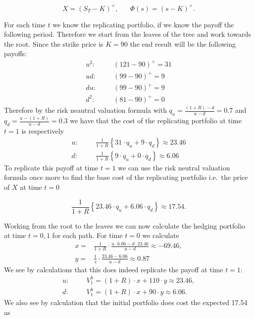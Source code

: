 \documentclass[
]{book}
\begin{document}
\[
X=(S_T-K)^+,\hspace{20pt}\Phi(s)=(s-K)^+.
\]

For each time \(t\) we know the replicating portfolio, if we know the payoff the following period. Therefore we start from the leaves of the tree and work towards the root. Since the strike price is \(K=90\) the end result will be the following payoffs:
\begin{align*}
u^2:\hspace{20pt}&(121-90)^+=31\\
ud:\hspace{20pt}&(99-90)^+=9\\
du:\hspace{20pt}&(99-90)^+=9\\
d^2:\hspace{20pt}&(81-90)^+=0
\end{align*}
Therefore by the risk neautral valuation formula with \(q_u=\frac{(1+R)-d}{u-d}=0.7\) and \(q_d=\frac{u-(1+R)}{u-d}=0.3\) we have that the cost of the replicating portfolio at time \(t=1\) is respectively
\begin{align*}
u:\hspace{20pt}&\frac{1}{1+R}\left\{31\cdot q_u + 9 \cdot q_d\right\}\approx 23.46\\
d:\hspace{20pt}&\frac{1}{1+R}\left\{9\cdot q_u + 0 \cdot q_d\right\}\approx 6.06
\end{align*}
To replicate this payoff at time \(t=1\) we can use the risk neutral valuation formula once more to find the base cost of the replicating portfolio i.e.~the price of \(X\) at time \(t=0\)

\[
\frac{1}{1+R}\left\{23.46\cdot q_u + 6.06 \cdot q_d\right\}\approx 17.54.
\]

Working from the root to the leaves we can now calculate the hedging portfolio at time \(t=0,1\) for each path. For time \(t=0\) we calculate
\begin{align*}
x=&\frac{1}{1+R}\cdot \frac{u\cdot 6.06-d\cdot 23.46}{u-d}\approx -69.46,\\
y=&\frac{1}{s}\cdot\frac{23.46-6.06}{u-d}\approx0.87
\end{align*}
We see by calculations that this does indeed replicate the payoff at time \(t=1\):
\begin{align*}
u:\hspace{20pt}&V_1^h=(1+R)\cdot x + 110\cdot y\approx 23.46,\\
d:\hspace{20pt}&V_1^h=(1+R)\cdot x + 90\cdot y\approx 6.06.
\end{align*}
We also see by calculation that the initial portfolio does cost the expected 17.54 as
\end{document}
